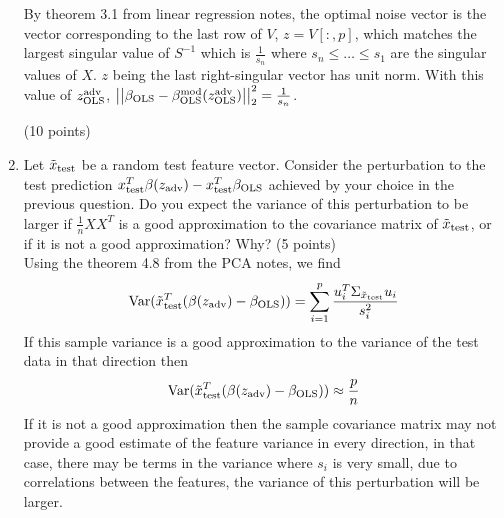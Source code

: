 \documentclass[11pt,twoside]{article}
\begin{document}
\begin{exam}
\begin{exercise}
\begin{problem}
\begin{enumerate}

By theorem 3.1 from linear regression notes,
 the optimal noise vector is the vector corresponding to the last row of $V$, $z=V[:,p]$, which matches the largest singular value of  $S^{-1}$ which is $\frac{1}{s_n}$ where
 $s_n \le \ldots \le s_1$ are the singular values of $X$. $z$ being the last right-singular vector has unit norm.
 With this value of $z^{\operatorname{adv}}_{\operatorname{OLS}}$, $\left|\left| \beta_{\operatorname{OLS}}  - \beta^{\operatorname{mod}}_{\operatorname{OLS}}(z^{\operatorname{adv}}_{\operatorname{OLS}} )  \right|\right| _{2}^2 = \frac{1}{s_n}$.

 (10 points)
\item Let $\tilde{ x }_{\operatorname{test}}$ be a random test feature vector. Consider the perturbation to the test prediction $x_{\operatorname{test}}^T\beta(z_{\operatorname{adv}}) - x_{\operatorname{test}}^T\beta_{\operatorname{OLS}}$ achieved by your choice in the previous question. Do you expect the variance of this perturbation to be larger if $\frac{1}{n}XX^T$ is a good approximation to the covariance matrix of $\tilde{ x }_{\operatorname{test}}$, or if it is not a good approximation? Why?
 (5 points)\\
 Using the theorem 4.8 from the PCA notes, we find
 $$
 	\var(\rnd{x}_{\op{test}}^T (\beta(z_{\op{adv}}) - \beta_{\op{OLS}}) ) = \sum_{i=1}^p \frac{u_i^T \Sigma_{\rnd{x}_{\op{test}}} u_i}{s_i^2}
 $$
 If this sample variance is a good approximation to the variance of the test data in that direction then
 $$
	 \var(\rnd{x}_{\op{test}}^T (\beta(z_{\op{adv}}) - \beta_{\op{OLS}}) ) \approx \frac{p}{n}
 $$
 If it is not a good approximation then the sample covariance matrix may not provide a good estimate of the feature variance in every direction, 
 in that case, there may be terms in the variance where $s_i$ is very small, due to correlations between the features, the variance of this perturbation will be larger.



\end{enumerate}
\end{problem}
\end{exercise}
\end{exam}
\end{document}
